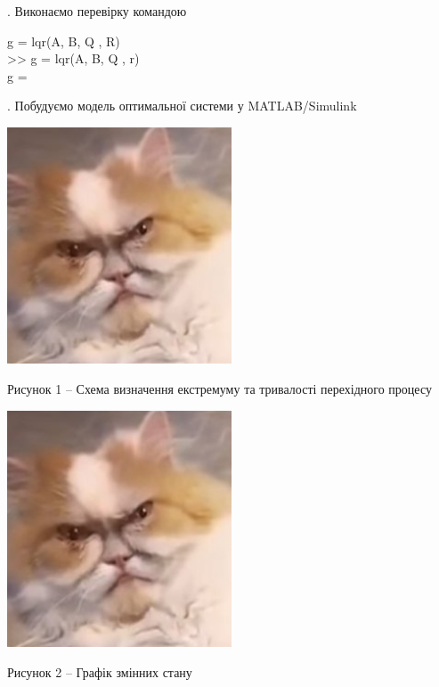 \documentclass[a4paper]{article}
\begin{document}
\hfill \break
{}. Виконаємо перевірку командою\\
\begin{center}
g = lqr(A, B, Q , R)\\
\hfill \break
>> g = lqr(A, B, Q , r)\\
\hfill \break
g =  \\
\hfill \break
\end{center}

\hfill \break
{}. Побудуємо модель оптимальної системи у MATLAB/Simulink\\
\begin{center}
\includegraphics[width=0.5\textwidth]{simulinkModel}
\end{center}
\begin{center}
Рисунок 1 – Схема визначення екстремуму та тривалості перехідного процесу\\
\end{center}
\begin{center}
\includegraphics[width=0.5\textwidth]{simulinkPlot}
\end{center}
\begin{center}
Рисунок 2 – Графік змінних стану\\
\end{center}
\end{document}
